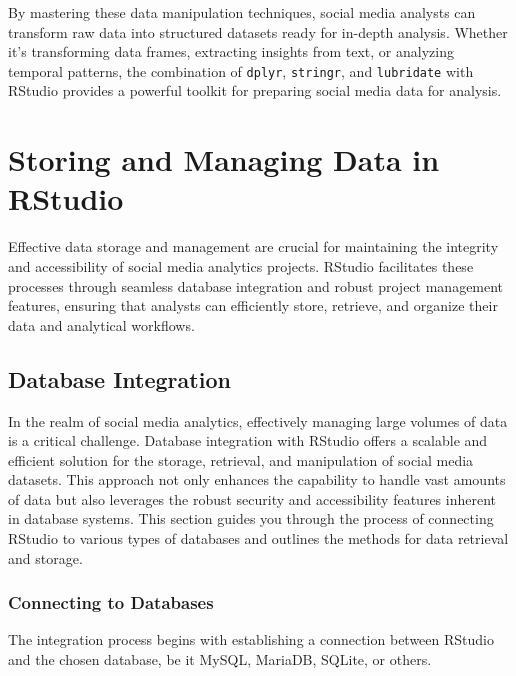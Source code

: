 \documentclass[
]{book}
\begin{document}
By mastering these data manipulation techniques, social media analysts can transform raw data into structured datasets ready for in-depth analysis. Whether it's transforming data frames, extracting insights from text, or analyzing temporal patterns, the combination of \texttt{dplyr}, \texttt{stringr}, and \texttt{lubridate} with RStudio provides a powerful toolkit for preparing social media data for analysis.

\hypertarget{storing-and-managing-data-in-rstudio}{%
\section{Storing and Managing Data in RStudio}\label{storing-and-managing-data-in-rstudio}}

Effective data storage and management are crucial for maintaining the integrity and accessibility of social media analytics projects. RStudio facilitates these processes through seamless database integration and robust project management features, ensuring that analysts can efficiently store, retrieve, and organize their data and analytical workflows.

\hypertarget{database-integration}{%
\subsection{Database Integration}\label{database-integration}}

In the realm of social media analytics, effectively managing large volumes of data is a critical challenge. Database integration with RStudio offers a scalable and efficient solution for the storage, retrieval, and manipulation of social media datasets. This approach not only enhances the capability to handle vast amounts of data but also leverages the robust security and accessibility features inherent in database systems. This section guides you through the process of connecting RStudio to various types of databases and outlines the methods for data retrieval and storage.

\hypertarget{connecting-to-databases}{%
\subsubsection{Connecting to Databases}\label{connecting-to-databases}}

The integration process begins with establishing a connection between RStudio and the chosen database, be it MySQL, MariaDB, SQLite, or others.
\end{document}
